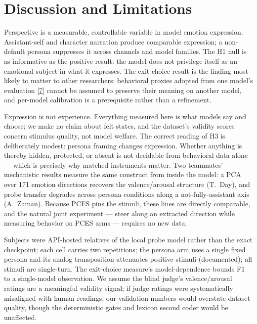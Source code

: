 \documentclass[11pt]{article}
\newcommand{\subsectiongray}[1]{%
  \vspace{2.5ex plus 0.5ex}%
  \noindent{\normalfont\large\color{gray}#1}%
  \vspace{0.6ex}\par\noindent%
}
\newcommand{\refnum}[2]{\hyperlink{#1}{#2}}
\newcommand{\citeExit}{[\refnum{ref:opusexit}{7}]}
\begin{document}
\section{Discussion and Limitations}

Perspective is a measurable, controllable variable in model emotion expression. Assistant-self and character narration produce comparable expression; a non-default persona suppresses it across channels and model families. The H1 null is as informative as the positive result: the model does not privilege itself as an emotional subject in what it expresses. The exit-choice result is the finding most likely to matter to other researchers: behavioral proxies adopted from one model's evaluation \citeExit{} cannot be assumed to preserve their meaning on another model, and per-model calibration is a prerequisite rather than a refinement.

Expression is not experience. Everything measured here is what models say and choose; we make no claim about felt states, and the dataset's validity scores concern stimulus quality, not model welfare. The correct reading of H3 is deliberately modest: persona framing changes expression. Whether anything is thereby hidden, protected, or absent is not decidable from behavioral data alone --- which is precisely why matched instruments matter. Two teammates' mechanistic results measure the same construct from inside the model: a PCA over 171 emotion directions recovers the valence/arousal structure (T.~Day), and probe transfer degrades across persona conditions along a not-fully-assistant axis (A.~Zaman). Because PCES pins the stimuli, these lines are directly comparable, and the natural joint experiment --- steer along an extracted direction while measuring behavior on PCES arms --- requires no new data.

\subsectiongray{Limitations}

Subjects were API-hosted relatives of the local probe model rather than the exact checkpoint; each cell carries two repetitions; the persona arm uses a single fixed persona and its analog transposition attenuates positive stimuli (documented); all stimuli are single-turn. The exit-choice measure's model-dependence bounds F1 to a single-model observation. We assume the blind judge's valence/arousal ratings are a meaningful validity signal; if judge ratings were systematically misaligned with human readings, our validation numbers would overstate dataset quality, though the deterministic gates and lexicon second coder would be unaffected.
\end{document}
